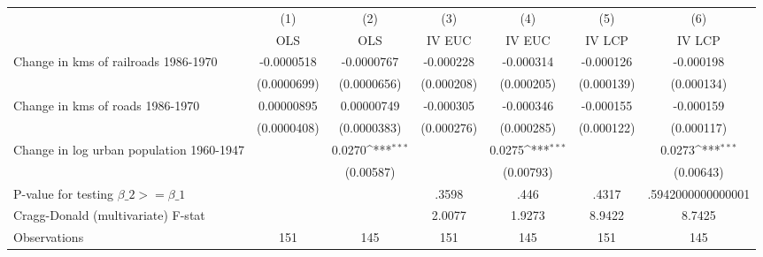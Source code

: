 {
\def\sym#1{\ifmmode^{#1}\else\(^{#1}\)\fi}
\begin{tabular}{l*{6}{c}}
\hline\hline
                &\multicolumn{1}{c}{(1)}&\multicolumn{1}{c}{(2)}&\multicolumn{1}{c}{(3)}&\multicolumn{1}{c}{(4)}&\multicolumn{1}{c}{(5)}&\multicolumn{1}{c}{(6)}\\
                &\multicolumn{1}{c}{OLS}&\multicolumn{1}{c}{OLS}&\multicolumn{1}{c}{IV EUC}&\multicolumn{1}{c}{IV EUC}&\multicolumn{1}{c}{IV LCP}&\multicolumn{1}{c}{IV LCP}\\
\hline
Change in kms of railroads 1986-1970&-0.0000518         &-0.0000767         &-0.000228         &-0.000314         &-0.000126         &-0.000198         \\
                &(0.0000699)         &(0.0000656)         &(0.000208)         &(0.000205)         &(0.000139)         &(0.000134)         \\
[1em]
Change in kms of roads 1986-1970&0.00000895         &0.00000749         &-0.000305         &-0.000346         &-0.000155         &-0.000159         \\
                &(0.0000408)         &(0.0000383)         &(0.000276)         &(0.000285)         &(0.000122)         &(0.000117)         \\
[1em]
Change in log urban population 1960-1947&                  &   0.0270\sym{***}&                  &   0.0275\sym{***}&                  &   0.0273\sym{***}\\
                &                  &(0.00587)         &                  &(0.00793)         &                  &(0.00643)         \\
\hline
P-value for testing $\beta\_{2} >= \beta\_{1}$&                  &                  &    .3598         &     .446         &    .4317         &.5942000000000001         \\
Cragg-Donald (multivariate) F-stat&                  &                  &   2.0077         &   1.9273         &   8.9422         &   8.7425         \\
Observations    &      151         &      145         &      151         &      145         &      151         &      145         \\
\hline\hline
\end{tabular}
}
